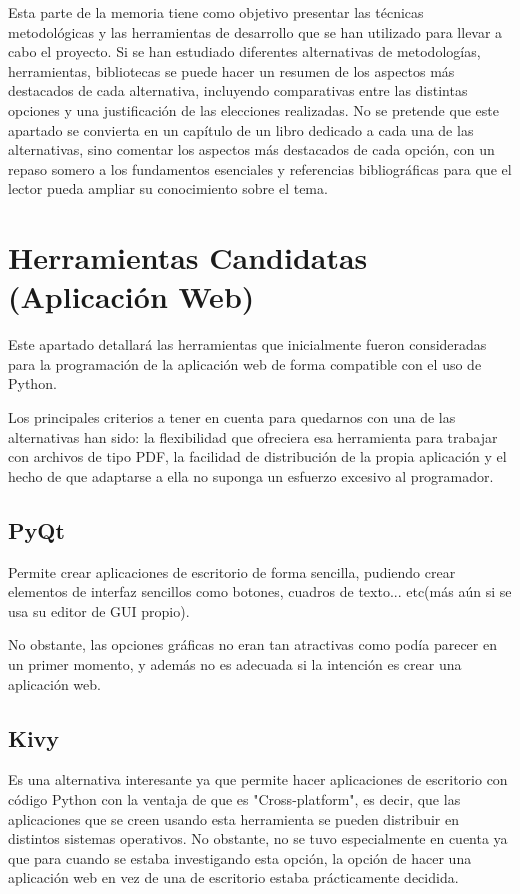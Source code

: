 
Esta parte de la memoria tiene como objetivo presentar las técnicas metodológicas y las herramientas de desarrollo que se han utilizado para llevar a cabo el proyecto. Si se han estudiado diferentes alternativas de metodologías, herramientas, bibliotecas se puede hacer un resumen de los aspectos más destacados de cada alternativa, incluyendo comparativas entre las distintas opciones y una justificación de las elecciones realizadas. 
No se pretende que este apartado se convierta en un capítulo de un libro dedicado a cada una de las alternativas, sino comentar los aspectos más destacados de cada opción, con un repaso somero a los fundamentos esenciales y referencias bibliográficas para que el lector pueda ampliar su conocimiento sobre el tema.

\section{Herramientas Candidatas (Aplicación Web)}
Este apartado detallará las herramientas que inicialmente fueron consideradas para la programación de la aplicación web de forma compatible con el uso de Python.


Los principales criterios a tener en cuenta para quedarnos con una de las alternativas han sido: la flexibilidad que ofreciera esa herramienta para trabajar con archivos de tipo PDF, la facilidad de distribución de la propia aplicación y el hecho de que adaptarse a ella no suponga un esfuerzo excesivo al programador.

\subsection{PyQt}
Permite crear aplicaciones de escritorio de forma sencilla, pudiendo crear elementos de interfaz sencillos como botones, cuadros de texto... etc(más aún si se usa su editor de GUI propio).

No obstante, las opciones gráficas no eran tan atractivas como podía parecer en un primer momento, y además no es adecuada si la intención es crear una aplicación web.

\subsection{Kivy}
Es una alternativa interesante ya que permite hacer aplicaciones de escritorio con código Python con la ventaja de que es "Cross-platform", es decir, que las aplicaciones que se creen usando esta herramienta se pueden distribuir en distintos sistemas operativos. 
No obstante, no se tuvo especialmente en cuenta ya que para cuando se estaba investigando esta opción, la opción de hacer una aplicación web en vez de una de escritorio estaba prácticamente decidida.

